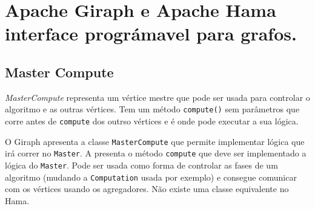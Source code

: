 \chapter{Apache Giraph e Apache Hama interface prográmavel para grafos.}

\section{Master Compute}
\textit{MasterCompute} representa um vértice mestre que pode ser usada para controlar o algoritmo e as outras vértices. Tem um método \texttt{compute()} sem parâmetros que corre antes de \texttt{compute} dos outrso vértices e é onde pode executar a sua lógica.


O Giraph apresenta a classe \texttt{MasterCompute} que permite implementar lógica que irá correr no \texttt{Master}. A presenta o método \texttt{compute} que deve ser implementado a lógica do \texttt{Master}. Pode ser usada como forma de controlar as fases de um algoritmo (mudando a \texttt{Computation} usada por exemplo) e consegue comunicar com os vértices usando os agregadores. Não existe uma classe equivalente no Hama.











